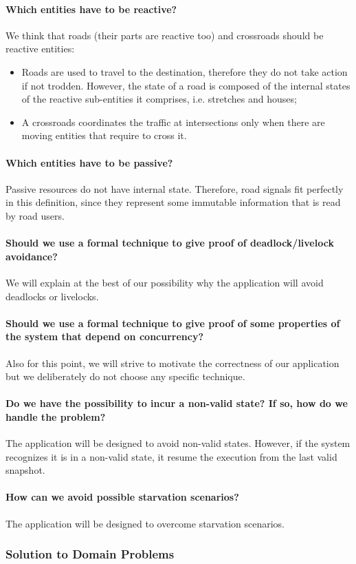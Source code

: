 \paragraph{Which entities have to be reactive?} We think that roads
(their parts are reactive too) and crossroads should be reactive entities:
\begin{itemize}
  \item Roads are used to travel to the destination, therefore they do not take
    action if not trodden. However, the state of a road is composed of the
    internal states of the reactive sub-entities it comprises, i.e. stretches
    and houses;
  \item A crossroads coordinates the traffic at intersections only when there
    are moving entities that require to cross it.
\end{itemize}

\paragraph{Which entities have to be passive?} Passive resources do not have
internal state. Therefore, road signals fit perfectly in this definition, since
they represent some immutable information that is read by road users.

\paragraph{Should we use a formal technique to give proof of deadlock/livelock
avoidance?} We will explain at the best of our possibility why the application
will avoid deadlocks or livelocks.

\paragraph{Should we use a formal technique to give proof of some properties of
the system that depend on concurrency?} Also for this point, we will strive to
motivate the correctness of our application but we deliberately do not choose
any specific technique.

\paragraph{Do we have the possibility to incur a non-valid state? If so, how do
we handle the problem?} The application will be designed to avoid non-valid
states. However, if the system recognizes it is in a non-valid state, it resume
the execution from the last valid snapshot.

\paragraph{How can we avoid possible starvation scenarios?} The application
will be designed to overcome starvation scenarios.

\subsubsection{Solution to Domain Problems}
